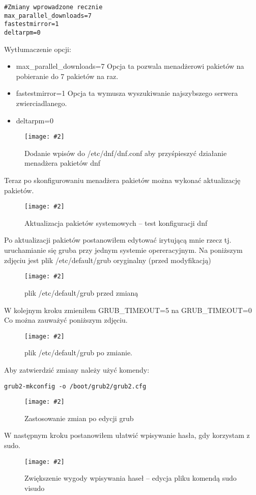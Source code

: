 \documentclass[a4paper]{article}
\newcommand*{\zdj}[2][\textwidth]{\texttt{[image: \#2]}}
\newcommand*{\fg}[4][!htb]{
      \begin{figure*}[#1]
            \zdj{#2}
            \caption[#4]{#3}
      \end{figure*}
}
\begin{document}
\begin{Verbatim}[frame=single]
#Zmiany wprowadzone recznie
max_parallel_downloads=7
fastestmirror=1
deltarpm=0
\end{Verbatim}

Wytłumaczenie opcji: \\

\begin{itemize}
\item max\_parallel\_downloads=7
Opcja ta pozwala menadżerowi pakietów na pobieranie do 7 pakietów na raz.
\item fastestmirror=1
Opcja ta wymusza wyszukiwanie najszybszego serwera zwierciadlanego.
\item deltarpm=0
\end{itemize}

\fg{contents/OS_installation/Fedora40/17.png}{Dodanie wpisów do /etc/dnf/dnf.conf aby przyśpieszyć działanie menadżera pakietów dnf}{Konfiguracja dnf}


\newpage
Teraz po skonfigurowaniu menadżera pakietów można wykonać aktualizację pakietów.
\fg{contents/OS_installation/Fedora40/18.png}{Aktualizacja pakietów systemowych – test konfiguracji dnf}{Aktualizacja pakietów}


Po aktualizacji pakietów postanowiłem edytować irytującą mnie rzecz tj. uruchamianie się gruba przy jednym systemie opereracyjnym.
Na poniższym zdjęciu jest plik /etc/default/grub oryginalny (przed modyfikacją)
\fg{contents/OS_installation/Fedora40/21.png}{plik /etc/default/grub przed zmianą}{plik /etc/default/grub przed zmianą}
\newpage
W kolejnym kroku zmieniłem GRUB\_TIMEOUT=5 na GRUB\_TIMEOUT=0
Co można zauważyć poniższym zdjęciu.
\fg{contents/OS_installation/Fedora40/22.png}{plik /etc/default/grub po zmianie.}{plik /etc/default/grub po zmianie}


Aby zatwierdzić zmiany należy użyć komendy: 
\begin{Verbatim}[frame=single]
grub2-mkconfig -o /boot/grub2/grub2.cfg
\end{Verbatim}
\fg{contents/OS_installation/Fedora40/24.png}{Zastosowanie zmian po edycji grub}{Zastosowanie zmian po edycji grub}
\newpage
W następnym kroku postanowiłem ułatwić wpisywanie hasła, gdy korzystam z sudo.
\fg{contents/OS_installation/Fedora40/25.png}{Zwiększenie wygody wpisywania haseł – edycja pliku komendą sudo visudo}{Zwiększenie wygody wpisywania haseł}
\end{document}
